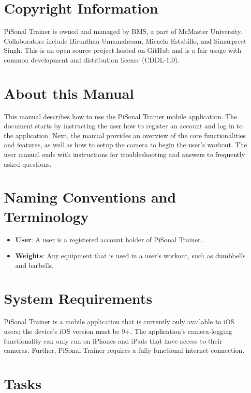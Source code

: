 \documentclass{article}
\begin{document}
\section{Copyright Information}
PiSonal Trainer is owned and managed by BMS, a part of McMaster University. Collaborators include Birunthaa Umamahesan, Micaela Estabillo, and Simarpreet Singh. This is an open source project hosted on GitHub and is a fair usage with common development and distribution license (CDDL-1.0).

\section{About this Manual}
This manual describes how to use the PiSonal Trainer mobile application. The document starts by instructing the user how to register an account and log in to the application. Next, the manual provides an overview of the core functionalities and features, as well as how to setup the camera to begin the user's workout. The user manual ends with instructions for troubleshooting and answers to frequently asked questions. 

\section{Naming Conventions and Terminology}
\begin{itemize}

    \item \textbf{User}: A user is a registered account holder of PiSonal Trainer. 

    \item \textbf{Weights}: Any equipment that is used in a user's workout, such as dumbbells and barbells.

\end{itemize}

\section{System Requirements}
PiSonal Trainer is a mobile application that is currently only available to iOS users; the device's iOS version must be 9+. The application's camera-logging functionality can only run on iPhones and iPads that have access to their cameras. Further, PiSonal Trainer requires a fully functional internet connection.

\section{Tasks}
\end{document}
